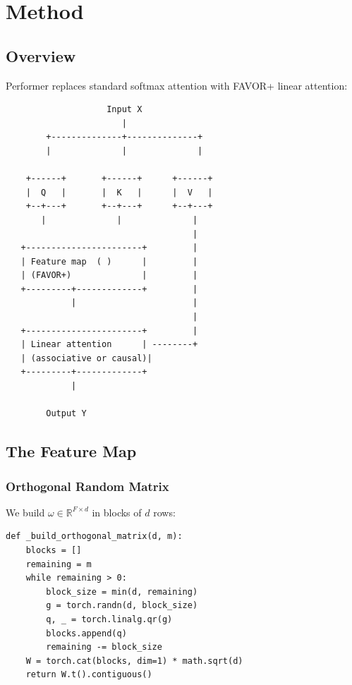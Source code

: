 
\section{Method}

\subsection{Overview}

Performer replaces standard softmax attention with FAVOR+ linear attention:

\begin{lstlisting}
                    Input X
                       |
        +--------------+--------------+
        |              |              |
                                       
    +------+       +------+      +------+
    |  Q   |       |  K   |      |  V   |
    +--+---+       +--+---+      +--+---+
       |              |              |
                                     |
   +-----------------------+         |
   | Feature map  ( )      |         |
   | (FAVOR+)              |         |
   +---------+-------------+         |
             |                       |
                                     |
   +-----------------------+         |
   | Linear attention      | --------+
   | (associative or causal)|
   +---------+-------------+
             |
              
        Output Y
\end{lstlisting}

\subsection{The Feature Map}

\subsubsection{Orthogonal Random Matrix}

We build $\omega \in \mathbb{R}^{F \times d}$ in blocks of $d$ rows:

\begin{lstlisting}
def _build_orthogonal_matrix(d, m):
    blocks = []
    remaining = m
    while remaining > 0:
        block_size = min(d, remaining)
        g = torch.randn(d, block_size)
        q, _ = torch.linalg.qr(g)
        blocks.append(q)
        remaining -= block_size
    W = torch.cat(blocks, dim=1) * math.sqrt(d)
    return W.t().contiguous()
\end{lstlisting}

